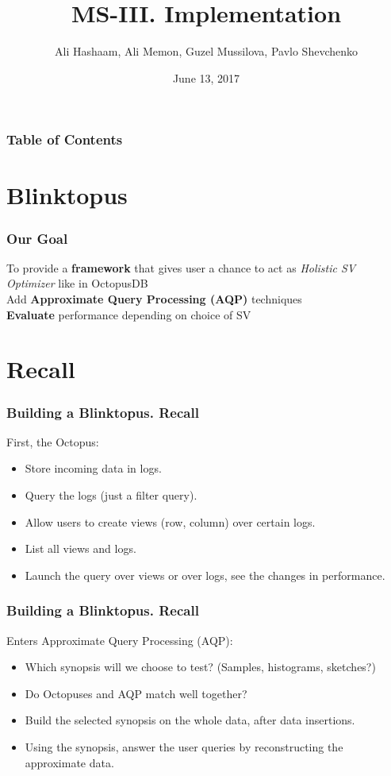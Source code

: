 \documentclass{beamer}
\title{MS-III. Implementation}
\author{Ali Hashaam, Ali Memon, Guzel Mussilova, Pavlo Shevchenko}
\date{June 13, 2017}
\institute{Scientific Project: Databases for Multi-Dimensional Data, Genomics and Modern Hardware}
\begin{document}
\begin{frame}[plain]
 \titlepage
\end{frame}

\begin{frame}
\frametitle{Table of Contents}
\tableofcontents 
\end{frame}

\section{Blinktopus}
\begin{frame}
\frametitle{Our Goal}
To provide a \textbf{framework} that gives user a chance to act as \textit{Holistic SV Optimizer} like in OctopusDB \\
Add \textbf{Approximate Query Processing (AQP)} techniques\\
\textbf{Evaluate} performance depending on choice of SV
\end{frame}


\section{Recall}
\begin{frame}
\frametitle{Building a Blinktopus. Recall}
First, the Octopus:
\begin{itemize}
\item{Store incoming data in logs.}
\item{Query the logs (just a filter query).}
\item{Allow users to create views (row, column) over certain logs.}
\item{List all views and logs.}
\item{Launch the query over views or over logs, see the changes in performance.}
\end{itemize}
\end{frame}


\begin{frame}
\frametitle{Building a Blinktopus. Recall}
Enters Approximate Query Processing (AQP):
\begin{itemize}
\item{Which synopsis will we choose to test? (Samples, histograms, sketches?)}
\item{Do Octopuses and AQP match well together?}
\item{Build the selected synopsis on the whole data, after data insertions.}
\item{Using the synopsis, answer the user queries by reconstructing the approximate data.}\\
\end{itemize}
\end{frame}
\end{document}
